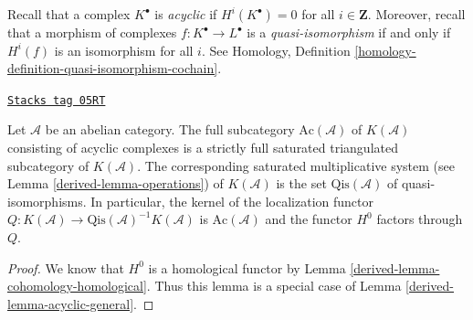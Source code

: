 \medskip\noindent
Recall that a complex $K^\bullet$ is {\it acyclic} if $H^i(K^\bullet) = 0$
for all $i \in \mathbf{Z}$. Moreover, recall that a morphism of complexes
$f : K^\bullet \to L^\bullet$ is a {\it quasi-isomorphism} if and only if
$H^i(f)$ is an isomorphism for all $i$. See
Homology, Definition \ref{homology-definition-quasi-isomorphism-cochain}.

\begin{lemma}[Acyclic]
\label{derived-lemma-acyclic}
\href{https://stacks.math.columbia.edu/tag/05RT}{\texttt{Stacks tag 05RT}}

Let $\mathcal{A}$ be an abelian category. The full subcategory
$\text{Ac}(\mathcal{A})$ of $K(\mathcal{A})$ consisting of acyclic complexes
is a strictly full saturated triangulated subcategory of $K(\mathcal{A})$.
The corresponding saturated multiplicative system (see
Lemma \ref{derived-lemma-operations})
of $K(\mathcal{A})$ is the set $\text{Qis}(\mathcal{A})$
of quasi-isomorphisms. In particular, the kernel of the localization
functor $Q : K(\mathcal{A}) \to \text{Qis}(\mathcal{A})^{-1}K(\mathcal{A})$
is $\text{Ac}(\mathcal{A})$ and the functor $H^0$ factors through $Q$.
\end{lemma}

\begin{proof}

We know that $H^0$ is a homological functor by
Lemma \ref{derived-lemma-cohomology-homological}.
Thus this lemma is a special case of
Lemma \ref{derived-lemma-acyclic-general}.
\end{proof}

